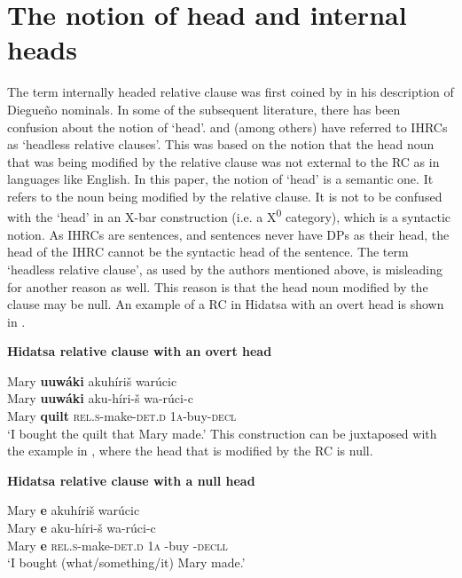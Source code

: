 \documentclass[output=paper]{LSP/langsci}
\begin{document}
\section{The notion of head and internal heads}\label{sec:boyle:3}

The term internally headed relative clause was first coined by \citet{Gorbet1976} in his description of Diegue\~no nominals.  In some of the subsequent literature, there has been confusion about the notion of `head'. \citet{Coleetal1982} and \citet{Weber1983} (among others) have referred to IHRCs as `headless relative clauses'. This was based on the notion that the head noun that was being modified by the relative clause was not external to the RC as in languages like English. In this paper, the notion of `head' is a semantic one. It refers to the noun being modified by the relative clause. It is not to be confused with the `head' in an X-bar construction (i.e. a X\textsuperscript{0} category), which is a syntactic notion. As IHRCs are sentences, and sentences never have DPs as their head, the head of the IHRC cannot be the syntactic head of the sentence.  The term `headless relative clause', as used by the authors mentioned above, is misleading for another reason as well.  This reason is that the head noun modified by the clause may be null.  An example of a RC in Hidatsa with an overt head is shown in .

\ea \textbf{Hidatsa relative clause with an overt head} \label{boyle9}

\glll Mary \textbf{uuw\'aki} akuh\'iri\v{s} war\'ucic\\
Mary \textbf{uuw\'aki} aku-h\'iri-\v{s}      wa-r\'uci-c\\
Mary \textbf{quilt} \textsc{rel.s}-make-\textsc{det.d} \textsc{1a}-buy-\textsc{decl} \\
\trans `I bought the quilt that Mary made.' 	
\z
This construction can be juxtaposed with the example in , where the head that is modified by the RC is null.

\ea \textbf{Hidatsa relative clause with a null head} \label{boyle10}

\glll Mary \textbf{e} akuh\'iri\v{s} war\'ucic\\
Mary \textbf{e} aku-h\'iri-\v{s}   wa-r\'uci-c\\
Mary \textbf{e} \textsc{rel.s}-make-\textsc{det.d} \textsc{1a} -buy -\textsc{decll}\\ 
\trans `I bought (what/something/it) Mary made.'
\z
\end{document}
